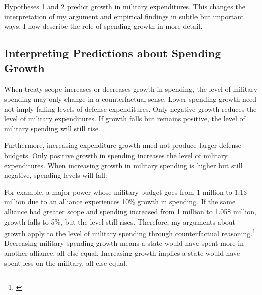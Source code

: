 \documentclass[12pt]{article}
\begin{document}
Hypotheses 1 and 2 predict growth in military expenditures. 
This changes the interpretation of my argument and empirical findings in subtle but important ways. 
I now describe the role of spending growth in more detail. 


\subsection{Interpreting Predictions about Spending Growth}


When treaty scope increases or decreases growth in spending, the level of military spending may only change in a counterfactual sense. 
Lower spending growth need not imply falling levels of defense expenditures. 
Only negative growth reduces the level of military expenditures. 
If growth falls but remains positive, the level of military spending will still rise. 


Furthermore, increasing expenditure growth nned not produce larger defense budgets. 
Only positive growth in spending increases the level of military expenditures. 
When increasing growth in military spending is higher but still negative, spending levels will fall. 


For example, a major power whose military budget goes from 1 million to 1.1\$ million due to an alliance experiences 10\% growth in spending. 
If the same alliance had greater scope and spending increased from 1 million to 1.05\$ million, growth falls to 5\%, but the level still rises. 
Therefore, my arguments about growth apply to the level of military spending through counterfactual reasoning.\footnote{\cite{Fearon1991}} 
Decreasing military spending growth means a state would have spent more in another alliance, all else equal. 
Increasing growth implies a state would have spent less on the military, all else equal.
\end{document}
